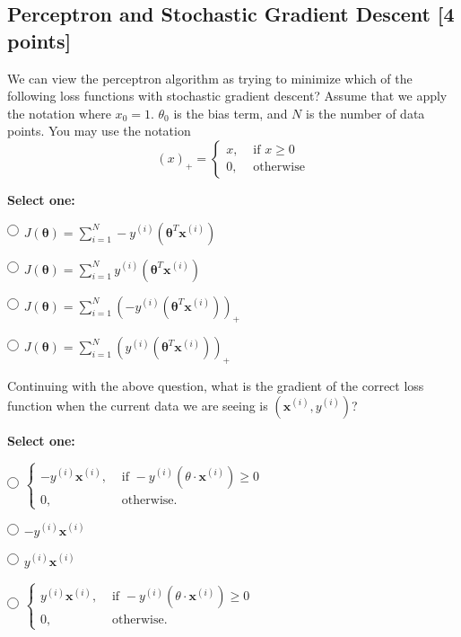 \documentclass[11pt]{exam}
\renewcommand{\circle}{\tikz\draw[black] (0,0) circle (1ex);}
\numberwithin{equation}{section} %
\numberwithin{figure}{section} %
\numberwithin{table}{section} %
\newcommand{\xv}{\mathbf{x}}
\begin{document}
\subsection{Perceptron and Stochastic Gradient Descent [4 points]}
\begin{questions}
    
    \question[2] We can view the perceptron algorithm as trying to minimize which of the following loss functions with stochastic gradient descent? Assume that we apply the notation where $x_0 = 1$. $\theta_0$ is the bias term, and $N$ is the number of data points. You may use the notation
    $$
    (x)_+ =
    \begin{cases}
    x, & \textrm{ if } x \geq 0 \\
    0, & \textrm{ otherwise}
    \end{cases}
    $$

    \textbf{Select one:}
    \begin{list}{}
        \item $\circle$ $J(\bm{\theta}) = \sum_{i=1}^N -y^{(i)}\left(\bm{\theta}^T \xv^{(i)}\right)$
        \item $\circle$ $J(\bm{\theta}) = \sum_{i=1}^N y^{(i)}\left(\bm{\theta}^T \xv^{(i)}\right)$
        \item $\circle$ $J(\bm{\theta}) = \sum_{i=1}^N \left(-y^{(i)}\left(\bm{\theta}^T \xv^{(i)}\right)\right)_+$
        \item $\circle$ $J(\bm{\theta}) = \sum_{i=1}^N \left(y^{(i)}\left(\bm{\theta}^T \xv^{(i)}\right)\right)_+$
    \end{list}


    \question[2] Continuing with the above question, what is the gradient of the correct loss function when the current data we are seeing is $\left(\xv^{(i)}, y^{(i)}\right)$?

    \textbf{Select one:}
    \begin{list}{}
        \item $\circle$ $\begin{cases}-y^{(i)}\xv^{(i)}, & \textrm{ if } -y^{(i)}\left(\theta\cdot \xv^{(i)}\right) \geq 0 \\
        0, & \textrm{ otherwise}.
        \end{cases}$
        \item $\circle$ $-y^{(i)}\xv^{(i)}$
        \item $\circle$ $y^{(i)}\xv^{(i)}$
        \item $\circle$ $\begin{cases}y^{(i)}\xv^{(i)}, & \textrm{ if } -y^{(i)}\left(\theta\cdot \xv^{(i)}\right) \geq 0 \\
        0, & \textrm{ otherwise}.
        \end{cases}$
    \end{list}

    
\end{questions}
\clearpage
\end{document}

